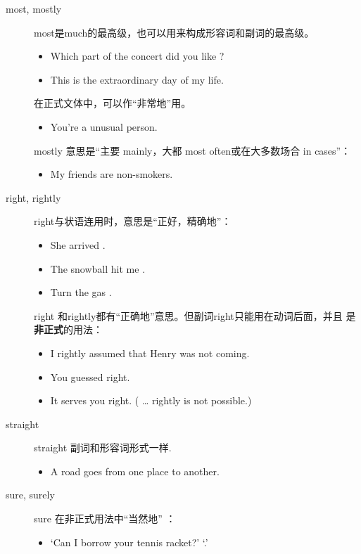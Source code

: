 \begin{description}
\item[most, mostly]
  most是much的最高级，也可以用来构成形容词和副词的最高级。
  \begin{itemize}
  \item Which part of the concert did you like ?
  \item This is the  extraordinary day of my life.
  \end{itemize}
  在正式文体中，可以作“非常地”用。
  \begin{itemize}
  \item You're a  unusual person.
  \end{itemize}

  mostly 意思是“主要 mainly，大都 most often或在大多数场合 in 
  cases”：
  \begin{itemize}
  \item My friends are  non-smokers.
  \end{itemize}

\item[right, rightly] right与状语连用时，意思是“正好，精确地”：
  \begin{itemize}
  \item She arrived  .
  \item The snowball hit me  .
  \item Turn the gas  .
  \end{itemize}

  right 和rightly都有“正确地”意思。但副词right只能用在动词后面，并且
  是\textbf{非正式}的用法：
  \begin{itemize}
  \item I rightly assumed that Henry was not coming.
  \item You guessed right.
  \item It serves you right. ( … rightly is not possible.)
  \end{itemize}

\item[straight] straight 副词和形容词形式一样.
  \begin{itemize}
  \item A  road goes  from one place to another.
  \end{itemize}

\item[sure, surely] sure 在非正式用法中“当然地” ：
\begin{itemize}
\item `Can I borrow your tennis racket?' `.'
\end{itemize}


\end{description}
